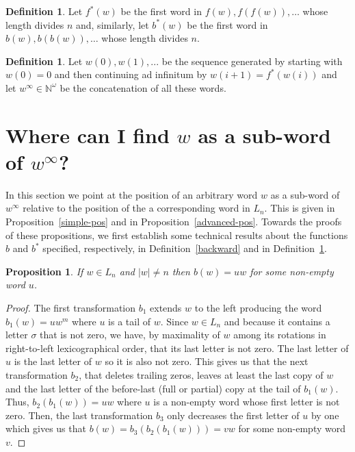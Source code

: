 \documentclass{article}
\newtheorem{proposition}[theorem]{Proposition}
\theoremstyle{definition}
\newtheorem{definition}[theorem]{Definition}
\newcommand{\N}{{\mathbb{N}}}
\begin{document}
\begin{definition} \label{star-functions}
	Let $f^*(w)$ be the first word in ${f(w),f(f(w)),\dots}$ whose length divides $n$ and, similarly, let $b^*(w)$ be the first word in ${b(w),b(b(w)),\dots}$ whose length divides $n$. 
\end{definition}


\begin{definition}
	Let $w(0),w(1),...$ be the sequence generated by starting with $w(0)=0$ and then continuing ad infinitum by $w{(i+1)}=f^*(w(i))$ and let $w^\infty\in \N^\omega$ be the concatenation of all these words.
\end{definition}



\section{Where can I find $w$ as a sub-word of $w^\infty$?}

In this section we point at the position of an arbitrary word $w$ as a sub-word of  $w^\infty$ relative to the position of the a corresponding word in $L_n$. This is given in Proposition~\ref{simple-pos} and in Proposition~\ref{advanced-pos}. Towards the proofs of these propositions, we first establish some technical results about the functions $b$ and $b^*$ specified, respectively, in Definition~\ref{backward} and in Definition~\ref{star-functions}.


\begin{proposition}
	\label{w-at-the-tail}
	If $w \in L_n$ and $|w| \neq n$ then  $b(w)=uw$ for some non-empty word $u$. 
\end{proposition}
\begin{proof}
	The first transformation $b_1$ extends $w$ to the left producing the word $b_1(w)=uw^m$ where $u$ is a tail of $w$. Since $w \in L_n$ and because it contains a letter $\sigma$ that is not zero, we have, by maximality of $w$ among its rotations in right-to-left lexicographical order,  that its last letter is not zero. The last letter of $u$ is the last letter of $w$ so it is also not zero. This gives us that the next transformation $b_2$, that deletes trailing zeros, leaves at least the last copy of $w$ and the last letter of the before-last (full or partial) copy at the tail of $b_1(w)$. Thus, $b_2(b_1(w))=uw$ where $u$ is a non-empty word whose first letter is not zero. Then, the last transformation $b_3$ only decreases the first letter of $u$ by  one which gives us that $b(w)=b_3(b_2(b_1(w)))=vw$ for some non-empty word $v$.	
\end{proof}
	
\end{document}
